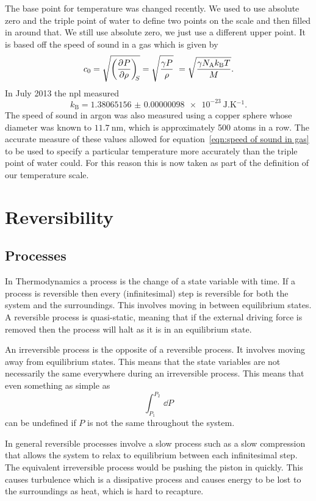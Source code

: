 \documentclass[a4paper]{article}
\newcommand{\boltzmann}{k_\mathrm{B}}
\newcommand{\avagadro}{N_\mathrm{A}}
\begin{document}
    The base point for temperature was changed recently.
    We used to use absolute zero and the triple point of water to define two points on the scale and then filled in around that.
    We still use absolute zero, we just use a different upper point.
    It is based off the speed of sound in a gas which is given by
    \begin{equation}\label{eqn:speed of sound in gas}
        c_0 = \sqrt{\pdvconst{P}{\rho}{S}} = \sqrt{\frac{\gamma P}{\rho}}\ = \sqrt{\frac{\gamma\avagadro\boltzmann T}{M}}.
    \end{equation}
    In July 2013 the \acrfull{npl} measured
    \[\boltzmann = \SI{1.38065156(98)e-23}{\joule.\kelvin^{-1}}.\]
    The speed of sound in argon was also measured using a copper sphere whose diameter was known to \(\SI{11.7}{\nano\metre}\), which is approximately 500 atoms in a row.
    The accurate measure of these values allowed for equation~\ref{eqn:speed of sound in gas} to be used to specify a particular temperature more accurately than the triple point of water could.
    For this reason this is now taken as part of the definition of our temperature scale.
    
    \section{Reversibility}
    \subsection{Processes}
    In Thermodynamics a process is the change of a state variable with time.
    If a process is reversible then every (infinitesimal) step is reversible for both the system and the surroundings.
    This involves moving in between equilibrium states.
    A reversible process is quasi-static, meaning that if the external driving force is removed then the process will halt as it is in an equilibrium state.
    
    An irreversible process is the opposite of a reversible process.
    It involves moving away from equilibrium states.
    This means that the state variables are not necessarily the same everywhere during an irreversible process.
    This means that even something as simple as
    \[\int_{P_1}^{P_2}\,\dd{P}\]
    can be undefined if \(P\) is not the same throughout the system.
    
    In general reversible processes involve a slow process such as a slow compression that allows the system to relax to equilibrium between each infinitesimal step.
    The equivalent irreversible process would be pushing the piston in quickly.
    This causes turbulence which is a dissipative process and causes energy to be lost to the surroundings as heat, which is hard to recapture.
    
\end{document}
